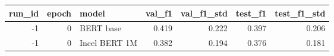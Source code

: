 \begin{tabular}{rrlrrrr}
\toprule
 run\_id &  epoch &         model &  val\_f1 &  val\_f1\_std &  test\_f1 &  test\_f1\_std \\
\midrule
     -1 &      0 &     BERT base &   0.419 &       0.222 &    0.397 &        0.206 \\
     -1 &      0 & Incel BERT 1M &   0.382 &       0.194 &    0.376 &        0.181 \\
\bottomrule
\end{tabular}
